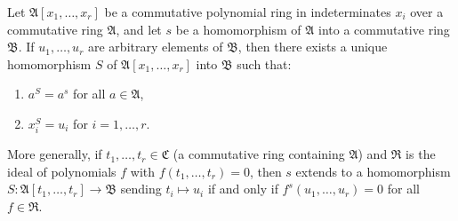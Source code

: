 Let $\mathfrak{A}[x_1, \dots, x_r]$ be a commutative polynomial ring in indeterminates $x_i$ over a commutative ring $\mathfrak{A}$, and let $s$ be a homomorphism of $\mathfrak{A}$ into a commutative ring $\mathfrak{B}$. If $u_1, \dots, u_r$ are arbitrary elements of $\mathfrak{B}$, then there exists a unique homomorphism $S$ of $\mathfrak{A}[x_1, \dots, x_r]$ into $\mathfrak{B}$ such that:
\begin{enumerate}
\item $a^S = a^s$ for all $a \in \mathfrak{A}$,
\item $x_i^S = u_i$ for $i = 1, \dots, r$.
\end{enumerate}

More generally, if $t_1, \dots, t_r \in \mathfrak{C}$ (a commutative ring containing $\mathfrak{A}$) and $\mathfrak{R}$ is the ideal of polynomials $f$ with $f(t_1, \dots, t_r) = 0$, then $s$ extends to a homomorphism $S: \mathfrak{A}[t_1, \dots, t_r] \to \mathfrak{B}$ sending $t_i \mapsto u_i$ if and only if $f^s(u_1, \dots, u_r) = 0$ for all $f \in \mathfrak{R}$.
